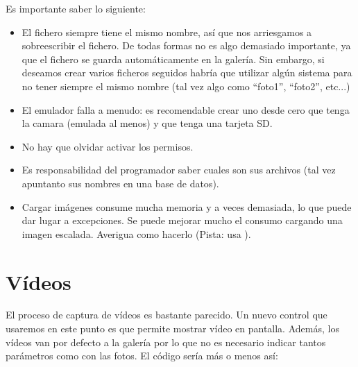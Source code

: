 \documentclass[a4paper,12pt,spanish]{sphinxmanual}
\begin{document}
Es importante saber lo siguiente:
\begin{itemize}
\item {} 
El fichero siempre tiene el mismo nombre, así que nos arriesgamos a sobreescribir el fichero. De todas formas no es algo demasiado importante, ya que el fichero se guarda automáticamente en la galería. Sin embargo, si deseamos crear varios ficheros seguidos habría que utilizar algún sistema para no tener siempre el mismo nombre (tal vez algo como ``foto1'', ``foto2'', etc...)

\item {} 
El emulador falla a menudo: es recomendable crear uno desde cero que tenga la camara (emulada al menos) y que tenga una tarjeta SD.

\item {} 
No hay que olvidar activar los permisos.

\item {} 
Es responsabilidad del programador saber cuales son sus archivos (tal vez apuntanto sus nombres en una base de datos).

\item {} 
Cargar imágenes consume mucha memoria y a veces demasiada, lo que puede dar lugar a excepciones. Se puede mejorar mucho el consumo cargando una imagen escalada. Averigua como hacerlo (Pista: usa ).

\end{itemize}


\section{Vídeos}
\label{tema2:videos}
El proceso de captura de vídeos es bastante parecido. Un nuevo control que usaremos en este punto es  que permite mostrar vídeo en pantalla. Además, los vídeos van por defecto a la galería por lo que no es necesario indicar tantos parámetros como con las fotos. El código sería más o menos así:
\end{document}
